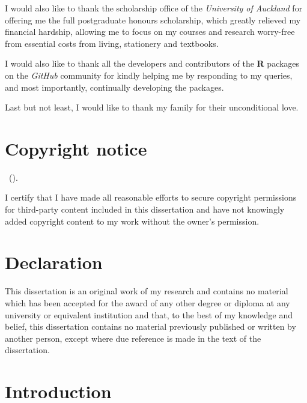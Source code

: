 \documentclass{aucklandthesis}
\begin{document}
I would also like to thank the scholarship office of the \emph{University of Auckland} for offering me the full postgraduate honours scholarship, which greatly relieved my financial hardship, allowing me to focus on my courses and research worry-free from essential costs from living, stationery and textbooks.

I would also like to thank all the developers and contributors of the \textbf{R} packages on the \emph{GitHub} community for kindly helping me by responding to my queries, and most importantly, continually developing the packages.

Last but not least, I would like to thank my family for their unconditional love.

\hypertarget{copyright-notice}{%
\chapter*{Copyright notice}\label{copyright-notice}}

\textcopyright { } \authorname~(\number\the\year).

I certify that I have made all reasonable efforts to secure copyright permissions for third-party content included in this dissertation and have not knowingly added copyright content to my work without the owner's permission.

\newpage

\hypertarget{declaration}{%
\chapter*{Declaration}\label{declaration}}

This dissertation is an original work of my research and contains no material which has been accepted for the award of any other degree or diploma at any university or equivalent institution and that, to the best of my knowledge and belief, this dissertation contains no material previously published or written by another person, except where due reference is made in the text of the dissertation.

\clearpage{}\setcounter{page}{0}

\hypertarget{ch:intro}{%
\chapter{Introduction}\label{ch:intro}}
\end{document}
